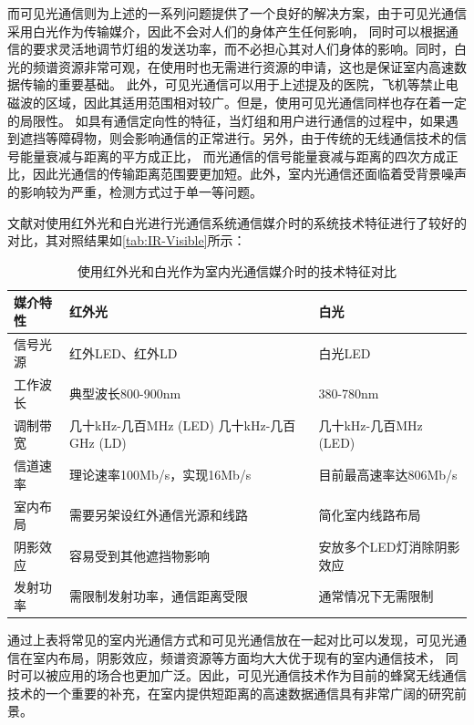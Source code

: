 而可见光通信则为上述的一系列问题提供了一个良好的解决方案，由于可见光通信采用白光作为传输媒介，因此不会对人们的身体产生任何影响，
同时可以根据通信的要求灵活地调节灯组的发送功率，而不必担心其对人们身体的影响。同时，白光的频谱资源非常可观，在使用时也无需进行资源的申请，这也是保证室内高速数据传输的重要基础。
此外，可见光通信可以用于上述提及的医院，飞机等禁止电磁波的区域，因此其适用范围相对较广。但是，使用可见光通信同样也存在着一定的局限性。
如具有通信定向性的特征，当灯组和用户进行通信的过程中，如果遇到遮挡等障碍物，则会影响通信的正常进行。另外，由于传统的无线通信技术的信号能量衰减与距离的平方成正比，
而光通信的信号能量衰减与距离的四次方成正比，因此光通信的传输距离范围要更加短。此外，室内光通信还面临着受背景噪声的影响较为严重，检测方式过于单一等问题。

文献\cite{Mei2011}对使用红外光和白光进行光通信系统通信媒介时的系统技术特征进行了较好的对比，其对照结果如\autoref{tab:IR-Visible}所示：

\begin{table}[htbp]
    \caption{使用红外光和白光作为室内光通信媒介时的技术特征对比}
    \label{tab:IR-Visible}
    \centering
    \begin{tabular}{lll}
        \toprule
        媒介特性 & 红外光 & 白光\\
        \midrule
        信号光源 & 红外LED、红外LD & 白光LED \\
        工作波长 & 典型波长800-900nm & 380-780nm \\
        调制带宽 & 几十kHz-几百MHz (LED) 几十kHz-几百GHz (LD) & 几十kHz-几百MHz (LED) \\
        信道速率 & 理论速率100Mb/s，实现16Mb/s & 目前最高速率达806Mb/s \\
        室内布局 & 需要另架设红外通信光源和线路 & 简化室内线路布局 \\
        阴影效应 & 容易受到其他遮挡物影响 & 安放多个LED灯消除阴影效应 \\
        发射功率 & 需限制发射功率，通信距离受限 & 通常情况下无需限制 \\
        \bottomrule
    \end{tabular}
\end{table}

通过上表将常见的室内光通信方式和可见光通信放在一起对比可以发现，可见光通信在室内布局，阴影效应，频谱资源等方面均大大优于现有的室内通信技术，
同时可以被应用的场合也更加广泛。因此，可见光通信技术作为目前的蜂窝无线通信技术的一个重要的补充，在室内提供短距离的高速数据通信具有非常广阔的研究前景。


